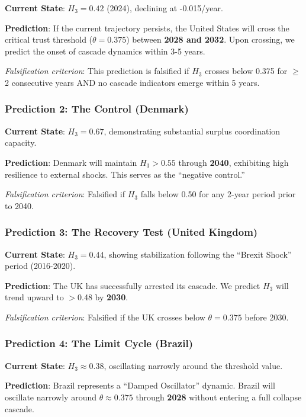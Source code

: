\documentclass[11pt,a4paper]{article}
\newcommand{\Hthree}{H_3}
\begin{document}
\textbf{Current State}: $\Hthree = 0.42$ (2024), declining at -0.015/year.

\textbf{Prediction}: If the current trajectory persists, the United States will cross the critical trust threshold ($\theta = 0.375$) between \textbf{2028 and 2032}. Upon crossing, we predict the onset of cascade dynamics within 3-5 years.

\textit{Falsification criterion}: This prediction is falsified if $\Hthree$ crosses below 0.375 for $\geq$2 consecutive years AND no cascade indicators emerge within 5 years.

\subsubsection{Prediction 2: The Control (Denmark)}

\textbf{Current State}: $\Hthree = 0.67$, demonstrating substantial surplus coordination capacity.

\textbf{Prediction}: Denmark will maintain $\Hthree > 0.55$ through \textbf{2040}, exhibiting high resilience to external shocks. This serves as the ``negative control.''

\textit{Falsification criterion}: Falsified if $\Hthree$ falls below 0.50 for any 2-year period prior to 2040.

\subsubsection{Prediction 3: The Recovery Test (United Kingdom)}

\textbf{Current State}: $\Hthree = 0.44$, showing stabilization following the ``Brexit Shock'' period (2016-2020).

\textbf{Prediction}: The UK has successfully arrested its cascade. We predict $\Hthree$ will trend upward to $>$0.48 by \textbf{2030}.

\textit{Falsification criterion}: Falsified if the UK crosses below $\theta = 0.375$ before 2030.

\subsubsection{Prediction 4: The Limit Cycle (Brazil)}

\textbf{Current State}: $\Hthree \approx 0.38$, oscillating narrowly around the threshold value.

\textbf{Prediction}: Brazil represents a ``Damped Oscillator'' dynamic. Brazil will oscillate narrowly around $\theta \approx 0.375$ through \textbf{2028} without entering a full collapse cascade.
\end{document}

